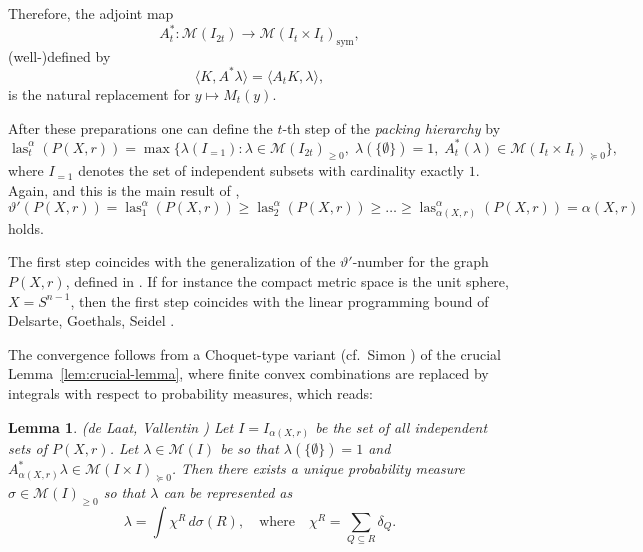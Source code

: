 \documentclass{amsart}
\newtheorem{lemma}[defin]{Lemma}
\DeclareMathOperator{\las}{las}
\DeclareMathOperator{\sym}{sym}
\begin{document}
Therefore, the adjoint map
\[
  A_t^* : \mathcal{M}(I_{2t}) \to \mathcal{M}(I_t \times I_t)_{\sym},
\]
(well-)defined by
\[
  \langle K, A^* \lambda \rangle = \langle A_t K, \lambda \rangle,
\]
is the natural replacement for $y \mapsto M_t(y)$.

After these preparations one can define the $t$-th step of the
\emph{packing hierarchy} by
\[
\las^\alpha_t(P(X,r)) = \max\{\lambda(I_{=1}) : \lambda \in \mathcal{M}(I_{2t})_{\geq 0}, \;
\lambda(\{\emptyset\}) = 1, \;
A_t^*(\lambda) \in \mathcal{M}(I_t \times I_t)_{\succeq 0} \},
\]
where $I_{=1}$ denotes the set of independent subsets with cardinality
exactly $1$.  Again, and this is the main result of
\cite{de-Laat-Vallentin-2015},
\[
        \vartheta'(P(X,r)) = \las^\alpha_1(P(X,r)) \geq \las^\alpha_2(P(X,r)) \geq \ldots \geq
      \las^\alpha_{\alpha(X,r)}(P(X,r)) = \alpha(X,r)
\]
holds.

The first step coincides with the generalization of the
$\vartheta'$-number for the graph $P(X,r)$, defined in
\cite{Bachoc-Nebe-Oliveira-Vallentin-2009}.  If for instance the
compact metric space is the unit sphere, $X = S^{n-1}$, then the first
step coincides with the linear programming bound of Delsarte,
Goethals, Seidel \cite{Delsarte-Goethals-Seidel-1977}.

The convergence follows from a Choquet-type variant (cf.\ Simon
\cite{Simon-2011}) of the crucial
Lemma~\ref{lem:crucial-lemma}, where finite convex combinations are
replaced by integrals with respect to probability measures, which
reads:

\begin{lemma} (de Laat, Vallentin \cite[Proposition
  1]{de-Laat-Vallentin-2015})
\label{lem:crucial-lemma-generalized}
  Let $I = I_{\alpha(X,r)}$ be the set of all independent sets of
$P(X,r)$.  Let $\lambda \in \mathcal{M}(I)$ be so that
$\lambda(\{\emptyset\}) = 1$ and
$A_{\alpha(X,r)}^* \lambda \in \mathcal{M}(I \times I)_{\succeq
  0}$. Then there exists a unique probability measure
$\sigma \in \mathcal{M}(I)_{\geq 0}$ so that $\lambda$ can be represented
as
  \[
    \lambda = \int \chi^R \, d\sigma(R), \quad \text{where} \quad \chi^R = \sum_{Q \subseteq R} \delta_Q.
  \]
\end{lemma}
 
\end{document}
